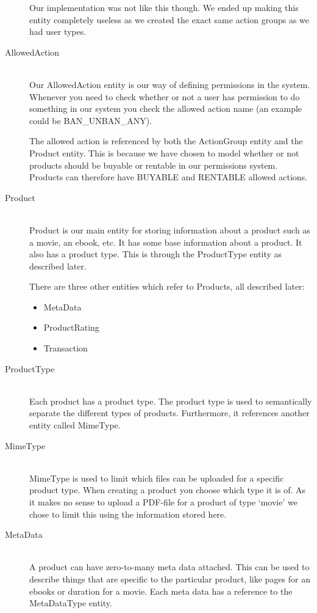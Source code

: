 \begin{description}
Our implementation was not like this though. We ended up making this entity completely useless as we created the exact same action groups as we had user types.

\item[AllowedAction] \hfill \\
Our AllowedAction entity is our way of defining permissions in the system. Whenever you need to check whether or not a user has permission to do something in our system you check the allowed action name (an example could be BAN\_UNBAN\_ANY).

The allowed action is referenced by both the ActionGroup entity and the Product entity. This is because we have chosen to model whether or not products should be buyable or rentable in our permissions system. Products can therefore have BUYABLE and RENTABLE allowed actions.

\item[Product] \hfill \\ 
Product is our main entity for storing information about a product such as a movie, an ebook, etc. It has some base information about a product. It also has a product type. This is through the ProductType entity as described later.

There are three other entities which refer to Products, all described later:
\begin{itemize}
	\item MetaData
	\item ProductRating
	\item Transaction
\end{itemize}

\item[ProductType] \hfill \\
Each product has a product type. The product type is used to semantically separate the different types of products. Furthermore, it references another entity called MimeType.

\item[MimeType] \hfill \\
MimeType is used to limit which files can be uploaded for a specific product type. When creating a product you choose which type it is of. As it makes no sense to upload a PDF-file for a product of type `movie' we chose to limit this using the information stored here.

\item[MetaData] \hfill \\
A product can have zero-to-many meta data attached. This can be used to describe things that are specific to the particular product, like pages for an ebooks or duration for a movie. Each meta data has a reference to the MetaDataType entity.


\end{description}
